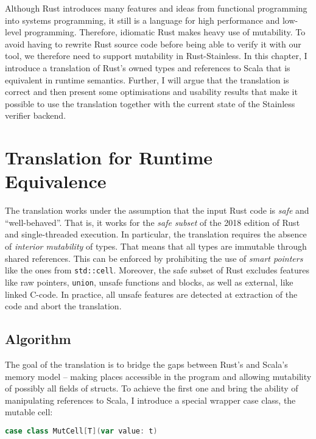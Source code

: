 Although Rust introduces many features and ideas from functional programming
into systems programming, it still is a language for high performance and
low-level programming. Therefore, idiomatic Rust makes heavy use of mutability.
To avoid having to rewrite Rust source code before being able to verify it with
our tool, we therefore need to support mutability in Rust-Stainless. In this
chapter, I introduce a translation of Rust's owned types and references to Scala
that is equivalent in runtime semantics. Further, I will argue that the
translation is correct and then present some optimisations and usability results
that make it possible to use the translation together with the current state of
the Stainless verifier backend.

\section{Translation for Runtime Equivalence}
\label{sec:translation}

The translation works under the assumption that the input Rust code is
\emph{safe} and ``well-behaved''. That is, it works for the \emph{safe subset}
\cite[section "Unsafety"]{rustref} of the 2018 edition of Rust and
single-threaded execution. In particular, the translation requires the absence
of \emph{interior mutability} \cite[section "Interior Mutability"]{rustref} of
types. That means that all types are immutable through shared references. This
can be enforced by prohibiting the use of \emph{smart pointers} like the ones
from \passthrough{\lstinline!std::cell!}. Moreover, the safe subset of Rust
excludes features like raw pointers, \passthrough{\lstinline!union!}, unsafe
functions and blocks, as well as external, like linked C-code. In practice, all
unsafe features are detected at extraction of the code and abort the
translation.


\subsection{Algorithm}

The goal of the translation is to bridge the gaps between Rust's and Scala's
memory model -- making places accessible in the program and allowing mutability
of possibly all fields of structs. To achieve the first one and bring the
ability of manipulating references to Scala, I introduce a special wrapper case
class, the mutable cell:

\begin{lstlisting}[language=Scala, style=short]
case class MutCell[T](var value: t)
\end{lstlisting}

